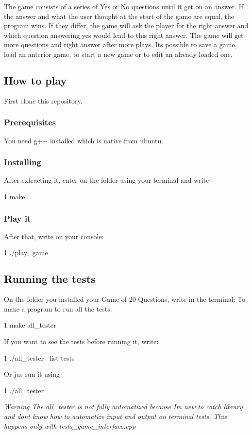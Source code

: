 The game consists of a series of Yes or No questions until it get on an answer. If the answer and what the user thought at the start of the game are equal, the program wins. If they differ, the game will ask the player for the right answer and which question answering yes would lead to this right answer. The game will get more questions and right answer after more plays. It\textquotesingle{}s possible to save a game, load an anterior game, to start a new game or to edit an already loaded one.

\subsection*{How to play}

First clone this repository.

\subsubsection*{Prerequisites}

You need g++ installed which is native from ubuntu.

\subsubsection*{Installing}

After extracting it, enter on the folder using your terminal and write 
\begin{DoxyCode}
1 make
\end{DoxyCode}


\subsubsection*{Play it}

After that, write on your console\+: 
\begin{DoxyCode}
1 ./play\_game
\end{DoxyCode}


\subsection*{Running the tests}

On the folder you installed your Game of 20 Questions, write in the terminal\+: To make a program to run all the tests\+: 
\begin{DoxyCode}
1 make all\_tester
\end{DoxyCode}
 If you want to see the tests before running it, write\+: 
\begin{DoxyCode}
1 ./all\_tester --list-tests
\end{DoxyCode}
 Or jus run it using 
\begin{DoxyCode}
1 ./all\_tester 
\end{DoxyCode}
 {\itshape Warning The all\+\_\+tester is not fully automatized because I\textquotesingle{}m new to catch library and don\textquotesingle{}t know how to automatize input and output on terminal tests. This happens only with tests\+\_\+game\+\_\+interface.\+cpp}

